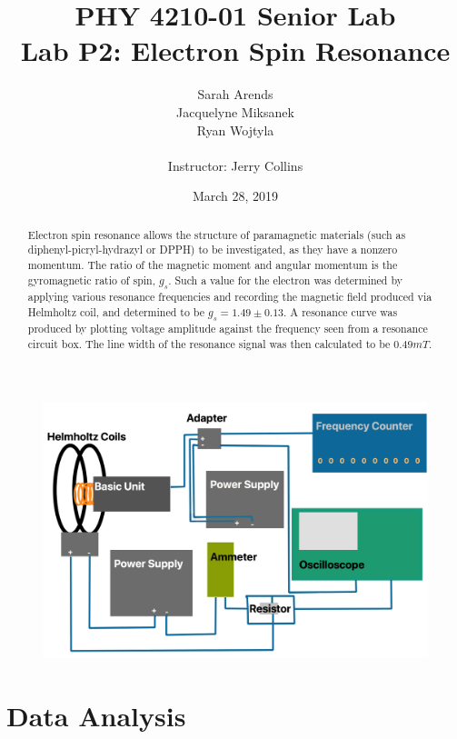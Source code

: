 \documentclass[a4paper]{article}
\title{PHY 4210-01 Senior Lab \\Lab P2: Electron Spin Resonance}
\author{Sarah Arends \\
        Jacquelyne Miksanek \\
        Ryan Wojtyla \\ \\
        Instructor: Jerry Collins}
\date{March 28, 2019}
\begin{document}
\maketitle

\begin{abstract}

\qq Electron spin resonance allows the structure of paramagnetic materials (such as diphenyl-picryl-hydrazyl or DPPH) to be investigated, as they have a nonzero momentum. The ratio of the magnetic moment and angular momentum is the gyromagnetic ratio of spin, $g_s$. Such a value for the
electron was determined by applying various resonance frequencies and recording the magnetic field produced via Helmholtz coil, and determined to be $g_s = 1.49 \pm 0.13$.  A resonance curve was produced by plotting voltage amplitude against the frequency seen from a resonance circuit box. The line width of the resonance signal was then calculated to be $0.49mT$.

\end{abstract}

\newpage

\tableofcontents

\newpage

\begin{figure}[H]
\centering
\includegraphics[width=1\textwidth]{Circuit_Diagram_P2Lab.png}
\label{Circuit_Diagram}
\end{figure}

\section{Data Analysis}
\end{document}
